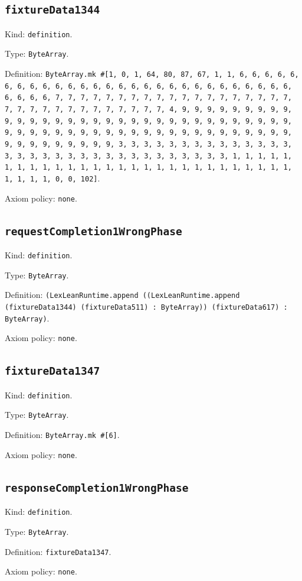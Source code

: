 \documentclass[11pt]{article}
\begin{document}
\subsection*{\texttt{fixtureData1344}}
\noindent Kind: \texttt{definition}.\par
\noindent Type: \texttt{ByteArray}.\par
\noindent Definition: \texttt{ByteArray.mk \#[1, 0, 1, 64, 80, 87, 67, 1, 1, 6, 6, 6, 6, 6, 6, 6, 6, 6, 6, 6, 6, 6, 6, 6, 6, 6, 6, 6, 6, 6, 6, 6, 6, 6, 6, 6, 6, 6, 6, 6, 6, 7, 7, 7, 7, 7, 7, 7, 7, 7, 7, 7, 7, 7, 7, 7, 7, 7, 7, 7, 7, 7, 7, 7, 7, 7, 7, 7, 7, 7, 7, 7, 7, 4, 9, 9, 9, 9, 9, 9, 9, 9, 9, 9, 9, 9, 9, 9, 9, 9, 9, 9, 9, 9, 9, 9, 9, 9, 9, 9, 9, 9, 9, 9, 9, 9, 9, 9, 9, 9, 9, 9, 9, 9, 9, 9, 9, 9, 9, 9, 9, 9, 9, 9, 9, 9, 9, 9, 9, 9, 9, 9, 9, 9, 9, 9, 9, 9, 3, 3, 3, 3, 3, 3, 3, 3, 3, 3, 3, 3, 3, 3, 3, 3, 3, 3, 3, 3, 3, 3, 3, 3, 3, 3, 3, 3, 3, 3, 3, 3, 1, 1, 1, 1, 1, 1, 1, 1, 1, 1, 1, 1, 1, 1, 1, 1, 1, 1, 1, 1, 1, 1, 1, 1, 1, 1, 1, 1, 1, 1, 1, 1, 0, 0, 102]}.\par
\noindent Axiom policy: \texttt{none}.\par
\subsection*{\texttt{requestCompletion1WrongPhase}}
\noindent Kind: \texttt{definition}.\par
\noindent Type: \texttt{ByteArray}.\par
\noindent Definition: \texttt{(LexLeanRuntime.append ((LexLeanRuntime.append (fixtureData1344) (fixtureData511) : ByteArray)) (fixtureData617) : ByteArray)}.\par
\noindent Axiom policy: \texttt{none}.\par
\subsection*{\texttt{fixtureData1347}}
\noindent Kind: \texttt{definition}.\par
\noindent Type: \texttt{ByteArray}.\par
\noindent Definition: \texttt{ByteArray.mk \#[6]}.\par
\noindent Axiom policy: \texttt{none}.\par
\subsection*{\texttt{responseCompletion1WrongPhase}}
\noindent Kind: \texttt{definition}.\par
\noindent Type: \texttt{ByteArray}.\par
\noindent Definition: \texttt{fixtureData1347}.\par
\noindent Axiom policy: \texttt{none}.\par
\end{document}
